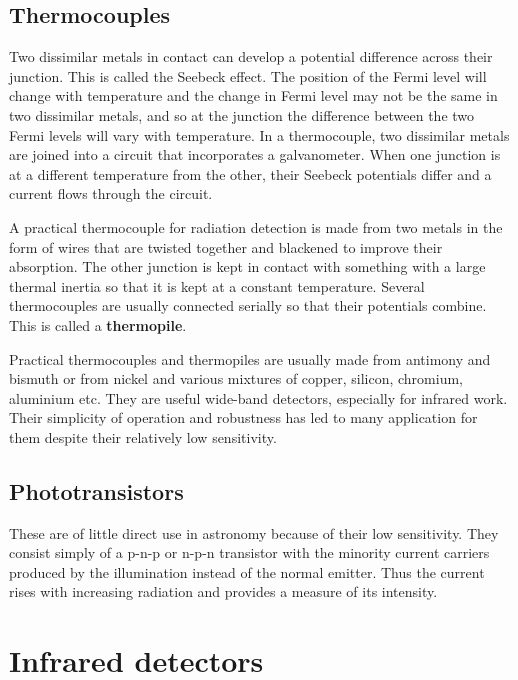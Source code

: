 \subsection{Thermocouples}
Two dissimilar metals in contact can
develop a potential difference across their junction. This is called
the Seebeck effect. The position of the Fermi level will change with
temperature and the change in Fermi level may not be the same in two
dissimilar metals, and so at the junction the difference between the
two Fermi levels will vary with temperature. In a thermocouple, two
dissimilar metals are joined into a circuit that incorporates a
galvanometer. When one junction is at a different temperature from the
other, their Seebeck potentials differ and a current flows through the
circuit. 

A practical thermocouple for radiation detection is made from two
metals in the form of wires that are twisted together and blackened to
improve their absorption. The other junction is kept in contact with
something with a large thermal inertia so that it is kept at a
constant temperature. Several thermocouples are usually connected
serially so that their potentials combine. This is called a {\bf
  thermopile}.

Practical thermocouples and thermopiles are usually made from antimony
and bismuth or from nickel and various mixtures of copper, silicon,
chromium, aluminium etc. They are useful wide-band detectors,
especially for infrared work. Their simplicity of operation and
robustness has led to many application for them despite their
relatively low sensitivity.

\subsection{Phototransistors}
These are of little direct use in
astronomy because of their low sensitivity. They consist simply of a
p-n-p or n-p-n transistor with the minority current carriers produced
by the illumination instead of the normal emitter. Thus the current
rises with increasing radiation and provides a measure of its intensity.


\section{Infrared detectors}

